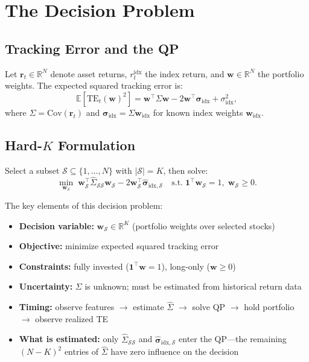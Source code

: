 \documentclass[11pt]{article}
\newcommand{\bw}{\mathbf{w}}
\newcommand{\br}{\mathbf{r}}
\newcommand{\bSigma}{\hat{\Sigma}}
\newcommand{\bsigma}{\boldsymbol{\sigma}}
\newcommand{\cS}{\mathcal{S}}
\begin{document}
\section{The Decision Problem}
\label{sec:formulation}

\subsection{Tracking Error and the QP}

Let $\br_t \in \mathbb{R}^N$ denote asset returns, $r_t^{\text{idx}}$ the index return, and $\bw \in \mathbb{R}^N$ the portfolio weights. The expected squared tracking error is:
\begin{equation}
  \mathbb{E}[\text{TE}_t(\bw)^2] = \bw^\top \Sigma \bw - 2\bw^\top \bsigma_{\text{idx}} + \sigma_{\text{idx}}^2,
  \label{eq:te}
\end{equation}
where $\Sigma = \text{Cov}(\br_t)$ and $\bsigma_{\text{idx}} = \Sigma \bw_{\text{idx}}$ for known index weights $\bw_{\text{idx}}$.

\subsection{Hard-$K$ Formulation}

Select a subset $\cS \subseteq \{1,\dots,N\}$ with $|\cS| = K$, then solve:
\begin{equation}
  \min_{\bw_\cS} \; \bw_\cS^\top \bSigma_{\cS\cS} \bw_\cS - 2\bw_\cS^\top \hat{\bsigma}_{\text{idx},\cS}
  \quad \text{s.t.} \; \mathbf{1}^\top \bw_\cS = 1, \; \bw_\cS \geq 0.
  \label{eq:hard-k}
\end{equation}

The key elements of this decision problem:
\begin{itemize}[nosep]
  \item \textbf{Decision variable:} $\bw_\cS \in \mathbb{R}^K$ (portfolio weights over selected stocks)
  \item \textbf{Objective:} minimize expected squared tracking error
  \item \textbf{Constraints:} fully invested ($\mathbf{1}^\top \bw = 1$), long-only ($\bw \geq 0$)
  \item \textbf{Uncertainty:} $\Sigma$ is unknown; must be estimated from historical return data
  \item \textbf{Timing:} observe features $\to$ estimate $\bSigma$ $\to$ solve QP $\to$ hold portfolio $\to$ observe realized TE
  \item \textbf{What is estimated:} only $\bSigma_{\cS\cS}$ and $\hat{\bsigma}_{\text{idx},\cS}$ enter the QP---the remaining $(N{-}K)^2$ entries of $\bSigma$ have zero influence on the decision
\end{itemize}
\end{document}
